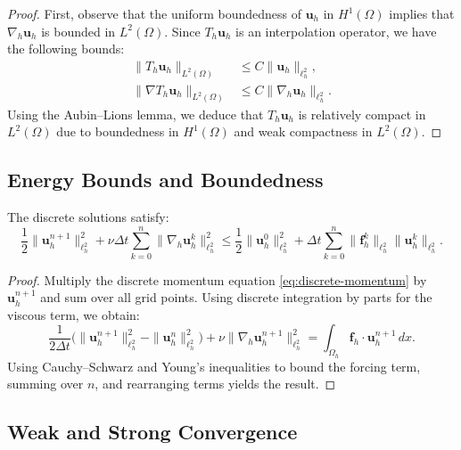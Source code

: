 \documentclass[12pt]{article}
\begin{document}
\begin{proof}
First, observe that the uniform boundedness of $\mathbf{u}_h$ in $H^1(\Omega)$ implies that $\nabla_h \mathbf{u}_h$ is bounded in $L^2(\Omega)$. Since $T_h \mathbf{u}_h$ is an interpolation operator, we have the following bounds:
\begin{align*}
\|T_h \mathbf{u}_h\|_{L^2(\Omega)} &\leq C \|\mathbf{u}_h\|_{\ell^2_h}, \\
\|\nabla T_h \mathbf{u}_h\|_{L^2(\Omega)} &\leq C \|\nabla_h \mathbf{u}_h\|_{\ell^2_h}.
\end{align*}
Using the Aubin--Lions lemma, we deduce that $T_h \mathbf{u}_h$ is relatively compact in $L^2(\Omega)$ due to boundedness in $H^1(\Omega)$ and weak compactness in $L^2(\Omega)$.
\end{proof}

\subsection{Energy Bounds and Boundedness}

\begin{lemma}
The discrete solutions satisfy:
\begin{equation}
\frac{1}{2} \|\mathbf{u}_h^{n+1}\|_{\ell^2_h}^2 + \nu \Delta t \sum_{k=0}^n \|\nabla_h \mathbf{u}_h^k\|_{\ell^2_h}^2 \leq \frac{1}{2} \|\mathbf{u}_h^0\|_{\ell^2_h}^2 + \Delta t \sum_{k=0}^n \|\mathbf{f}_h^k\|_{\ell^2_h} \|\mathbf{u}_h^k\|_{\ell^2_h}.
\end{equation}
\end{lemma}

\begin{proof}
Multiply the discrete momentum equation \eqref{eq:discrete-momentum} by $\mathbf{u}_h^{n+1}$ and sum over all grid points. Using discrete integration by parts for the viscous term, we obtain:
\begin{equation}
\frac{1}{2\Delta t} \Big(\|\mathbf{u}_h^{n+1}\|_{\ell^2_h}^2 - \|\mathbf{u}_h^n\|_{\ell^2_h}^2\Big) + \nu \|\nabla_h \mathbf{u}_h^{n+1}\|_{\ell^2_h}^2 = \int_{\Omega_h} \mathbf{f}_h \cdot \mathbf{u}_h^{n+1} \, dx.
\end{equation}
Using Cauchy--Schwarz and Young's inequalities to bound the forcing term, summing over $n$, and rearranging terms yields the result.
\end{proof}

\subsection{Weak and Strong Convergence}
\end{document}
